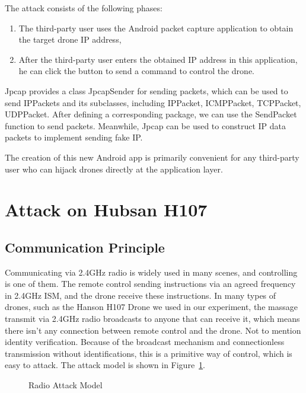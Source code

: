 \documentclass{acm_proc_article-sp}
\begin{document}
The attack consists of the following phases:

\begin{enumerate}
  \item The third-party user uses the Android packet capture application to obtain the target drone IP address,
  \item After the third-party user enters the obtained IP address in this application, he can click the button to send a command to control the drone.
\end{enumerate}


Jpcap provides a class JpcapSender for sending packets, which can be used to send IPPackets and its subclasses, including IPPacket, ICMPPacket, TCPPacket, UDPPacket\cite{jpcap}. After defining a corresponding package, we can use the SendPacket function to send packets. Meanwhile, Jpcap can be used to construct IP data packets to implement sending fake IP.

The creation of this new Android app is primarily convenient for any third-party user who can hijack drones directly at the application layer.


\section{Attack on Hubsan H107}

\subsection{Communication Principle}

Communicating via 2.4GHz radio is widely used in many scenes, and controlling is one of them. The remote control sending instructions via an agreed frequency in 2.4GHz ISM, and the drone receive these instructions. In many types of drones, such as the Hanson H107 Drone we used in our experiment, the massage transmit via 2.4GHz radio broadcasts to anyone that can receive it, which means there isn't any connection between remote control and the drone. Not to mention identity verification. Because of the broadcast mechanism and connectionless transmission without identifications, this is a primitive way of control, which is easy to attack. The attack model is shown in Figure~\ref{radio}.

\begin{figure}
\centering
{}
\caption{Radio Attack Model}
\label{radio}
\end{figure}
\end{document}
